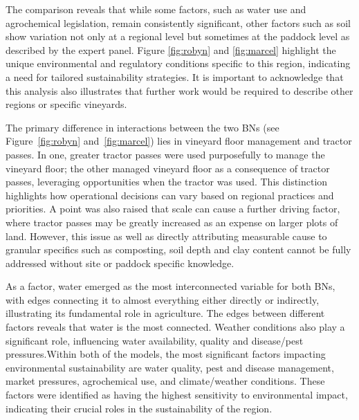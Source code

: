
The comparison reveals that while some factors, such as water use and agrochemical legislation, remain consistently significant, other factors such as soil show variation not only at a regional level but sometimes at the paddock level as described by the expert panel. Figure \ref{fig:robyn} and \ref{fig:marcel} highlight the unique environmental and regulatory conditions specific to this region, indicating a need for tailored sustainability strategies. It is important to acknowledge that this analysis also illustrates that further work would be required to describe other regions or specific vineyards. 

The primary difference in interactions between the two BNs (see Figure~\ref{fig:robyn} and~\ref{fig:marcel}) lies in vineyard floor management and tractor passes. In one, greater tractor passes were used purposefully to manage the vineyard floor; the other managed vineyard floor as a consequence of tractor passes, leveraging opportunities when the tractor was used. This distinction highlights how operational decisions can vary based on regional practices and priorities. A point was also raised that scale can cause a further driving factor, where tractor passes may be greatly increased as an expense on larger plots of land. However, this issue as well as directly attributing measurable cause to granular specifics such as composting, soil depth and clay content cannot be fully addressed without site or paddock specific knowledge.

As a factor, water emerged as the most interconnected variable for both BNs, with edges connecting it to almost everything either directly or indirectly, illustrating its fundamental role in agriculture. The edges between different factors reveals that water is the most connected. Weather conditions also play a significant role, influencing water availability, quality and disease/pest pressures.Within both of the models, the most significant factors impacting environmental sustainability are water quality, pest and disease management, market pressures, agrochemical use, and climate/weather conditions. These factors were identified as having the highest sensitivity to environmental impact, indicating their crucial roles in the sustainability of the region.

